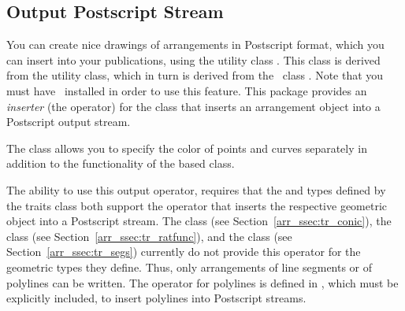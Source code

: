 \subsection{Output Postscript Stream}\label{arr_ssec:ps_stream}
You can create nice drawings of arrangements in Postscript format, which
you can insert into your publications, using the utility class 
. This class is derived from the 
 utility class, which in turn is derived from
the \leda\ class . Note that you must have \leda\ installed
in order to use this feature. 
This package provides an {\em inserter} (the \ccc{<<} operator) for
the  class that inserts an arrangement
object into a Postscript output stream.

The 
class allows you to specify the color of points and curves separately
in addition to the functionality of the based class. 

The ability to use this output operator, requires that the
 and  types defined by the
traits class both support the \ccc{<<} operator that inserts the
respective geometric object into a Postscript stream. The
 class (see Section~\ref{arr_ssec:tr_conic}), the
 class (see Section~\ref{arr_ssec:tr_ratfunc}),
and the  class (see Section~\ref{arr_ssec:tr_segs})
currently do not provide this operator for the geometric types they define.
Thus, only arrangements of line segments or of polylines can be written.
The \ccc{<<} operator for polylines is defined in
, which must be explicitly included,
to insert polylines into Postscript streams.

